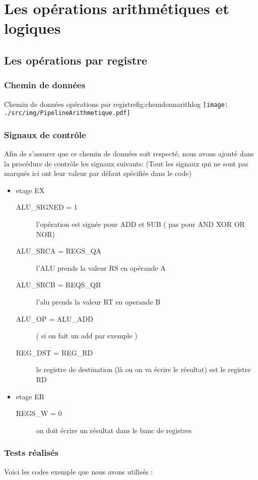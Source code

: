 \section{Les opérations arithmétiques et logiques}

\subsection{Les opérations par registre}
\subsubsection{Chemin de données}
\begin{figureGraphics}{Chemin de données opérations par registre}{fig:chemdonnarithlog}
  \centering
  \texttt{[image: ./src/img/PipelineArithmetique.pdf]}
\end{figureGraphics}
\subsubsection{Signaux de contrôle}
Afin de s’assurer que ce chemin de données soit respecté, nous avons ajouté dans la procédure de contrôle les signaux suivants:
(Tout les signaux qui ne sont pas marqués ici ont leur valeur par défaut spécifiée dans le code)
\begin{itemize}
  \item etage EX
    \begin{description}
      \item[ALU\_SIGNED = 1] l’opération est signée pour ADD et SUB ( pas pour AND XOR OR NOR)
      \item[ALU\_SRCA = REGS\_QA] l’ALU prends la valeur RS en opérande A
      \item[ALU\_SRCB = REQS\_QB] l’alu prends la valeur RT en operande B
      \item[ALU\_OP = ALU\_ADD] ( si on fait un add par exemple )
      \item[REG\_DST = REG\_RD] le registre de destination (là ou on va écrire le résultat) est le registre RD
    \end{description}
  \item etage ER
    \begin{description}
      \item[REGS\_W = 0] on doit écrire un résultat dans le banc de registres
    \end{description}
\end{itemize}
\subsubsection{Tests réalisés}
Voici les codes exemple que nous avons utilisés : 




